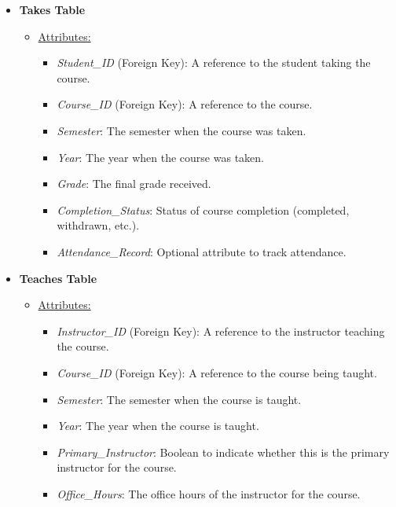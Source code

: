 \documentclass[12pt]{article}
\begin{document}
\begin{itemize}
    \item \textbf{Takes Table}
    \begin{itemize}
        \item \underline{Attributes:}
        \begin{itemize}
            \item \textit{Student\_ID} (Foreign Key): A reference to the student taking the course.
            \item \textit{Course\_ID} (Foreign Key): A reference to the course.
            \item \textit{Semester}: The semester when the course was taken.
            \item \textit{Year}: The year when the course was taken.
            \item \textit{Grade}: The final grade received.
            \item \textit{Completion\_Status}: Status of course completion (completed, withdrawn, etc.).
            \item \textit{Attendance\_Record}: Optional attribute to track attendance.
        \end{itemize}
    \end{itemize}
    
    \item \textbf{Teaches Table}
    \begin{itemize}
        \item \underline{Attributes:}
        \begin{itemize}
            \item \textit{Instructor\_ID} (Foreign Key): A reference to the instructor teaching the course.
            \item \textit{Course\_ID} (Foreign Key): A reference to the course being taught.
            \item \textit{Semester}: The semester when the course is taught.
            \item \textit{Year}: The year when the course is taught.
            \item \textit{Primary\_Instructor}: Boolean to indicate whether this is the primary instructor for the course.
            \item \textit{Office\_Hours}: The office hours of the instructor for the course.
        \end{itemize}
    \end{itemize}
\end{itemize}
\end{document}
